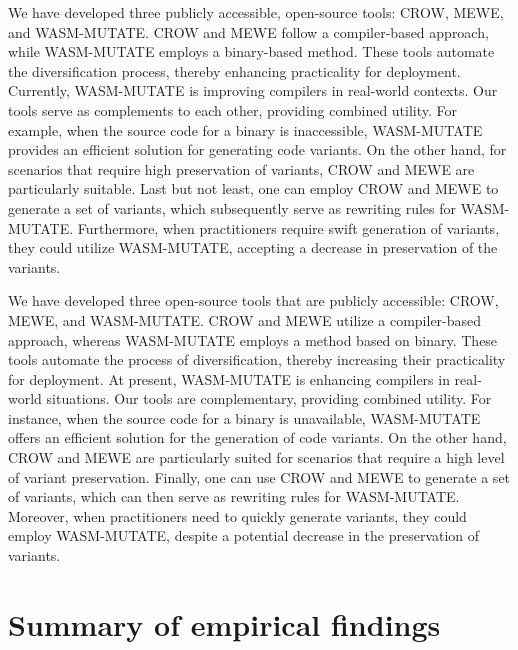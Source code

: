 
We have developed three publicly accessible, open-source tools: CROW, MEWE, and WASM-MUTATE. 
CROW and MEWE follow a compiler-based approach, while WASM-MUTATE employs a binary-based method. 
These tools automate the diversification process, thereby enhancing practicality for deployment. 
Currently, WASM-MUTATE is improving \Wasm compilers in real-world contexts. 
Our tools serve as complements to each other, providing combined utility. 
For example, when the source code for a \Wasm binary is inaccessible, WASM-MUTATE provides an efficient solution for generating code variants. 
On the other hand, for scenarios that require high preservation of variants, CROW and MEWE are particularly suitable.
Last but not least, one can employ CROW and MEWE to generate a set of variants, which subsequently serve as rewriting rules for WASM-MUTATE. 
Furthermore, when practitioners require swift generation of variants, they could utilize WASM-MUTATE, accepting a decrease in preservation of the variants.


We have developed three open-source tools that are publicly accessible: CROW, MEWE, and WASM-MUTATE. 
CROW and MEWE utilize a compiler-based approach, whereas WASM-MUTATE employs a method based on binary. 
These tools automate the process of diversification, thereby increasing their practicality for deployment. 
At present, WASM-MUTATE is enhancing \Wasm compilers in real-world situations. 
Our tools are complementary, providing combined utility. 
For instance, when the source code for a \Wasm binary is unavailable, WASM-MUTATE offers an efficient solution for the generation of code variants. 
On the other hand, CROW and MEWE are particularly suited for scenarios that require a high level of variant preservation.
Finally, one can use CROW and MEWE to generate a set of variants, which can then serve as rewriting rules for WASM-MUTATE. 
Moreover, when practitioners need to quickly generate variants, they could employ WASM-MUTATE, despite a potential decrease in the preservation of variants.


 

\section{Summary of empirical findings}

